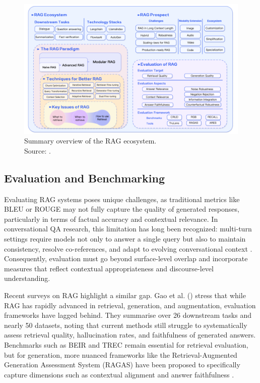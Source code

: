 \begin{spacing}{1.5}
\begin{figure}[H]
  \centering
  \includegraphics[width=\textwidth]{images/RAG_ecosystem.png} 
  \caption{Summary overview of the RAG ecosystem.\\
  \footnotesize{Source: \cite{gao_retrieval-augmented_2024}}.}
  \label{fig:summary_rag}
\end{figure}

\subsection{Evaluation and Benchmarking}
Evaluating RAG systems poses unique challenges, as traditional metrics like BLEU or ROUGE may not fully capture the quality of generated responses, particularly in terms of factual accuracy and contextual relevance. In conversational QA research, this limitation has long been recognized: multi-turn settings require models not only to answer a single query but also to maintain consistency, resolve co-references, and adapt to evolving conversational context \citep{zaib_conversational_2022}. Consequently, evaluation must go beyond surface-level overlap and incorporate measures that reflect contextual appropriateness and discourse-level understanding.

Recent surveys on RAG highlight a similar gap. Gao et al. () stress that while RAG has rapidly advanced in retrieval, generation, and augmentation, evaluation frameworks have lagged behind. They summarise over 26 downstream tasks and nearly 50 datasets, noting that current methods still struggle to systematically assess retrieval quality, hallucination rates, and faithfulness of generated answers. Benchmarks such as BEIR \citep{thakur_beir_2021} and TREC \citep{voorhees_trec_2005} remain essential for retrieval evaluation, but for generation, more nuanced frameworks like the Retrieval-Augmented Generation Assessment System (RAGAS) have been proposed to specifically capture dimensions such as contextual alignment and answer faithfulness \citep{es_ragas_2023}.


\end{spacing}
